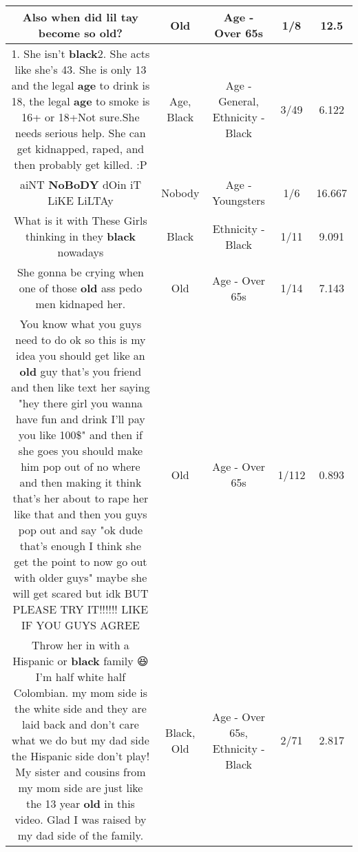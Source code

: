 \documentclass[11pt]{article}
\newlength\mylength
\begin{document}
\begin{center}
\begin{longtable}{|C{.65\mylength}|C{.30\mylength}|C{.12\mylength}|C{.12\mylength}|C{.12\mylength}|}
  \small Also when did lil tay become so \textbf{old}?\normalsize   & Old & Age - Over 65s & 1/8 & 12.5 \\  \hline
  \small 1. She isn't \textbf{black}2. She acts like she's 43. She is only 13 and the legal \textbf{age} to drink is 18, the legal \textbf{age} to smoke is 16+ or 18+Not sure.She needs serious help. She can get kidnapped, raped, and then probably get killed. :P\normalsize   & Age, Black & Age - General, Ethnicity - Black & 3/49 & 6.122 \\  \hline
  \small aiNT \textbf{NoBoDY} dOin iT LiKE LiLTAy\normalsize   & Nobody & Age - Youngsters & 1/6 & 16.667 \\  \hline
  \small What is it with These  Girls thinking in they \textbf{black} nowadays\normalsize   & Black & Ethnicity - Black & 1/11 & 9.091 \\  \hline
  \small She gonna be crying when one of those \textbf{old} ass pedo men kidnaped her.\normalsize   & Old & Age - Over 65s & 1/14 & 7.143 \\  \hline
  \small You know what you guys need to do ok so this is my idea you should get like an \textbf{old} guy that's you friend and then like text her saying "hey there girl you wanna have fun and drink I'll pay you like 100\$" and then if she goes you should make him pop out of no where and then making it think that's her about to rape her like that and then you guys pop out and say "ok dude that's enough I think she get the point to now go out with older guys" maybe she will get scared but idk BUT PLEASE TRY IT!!!!!! LIKE IF YOU GUYS AGREE\normalsize   & Old & Age - Over 65s & 1/112 & 0.893 \\  \hline
  \small Throw her in with a Hispanic or \textbf{black} family 😆 I'm half white half Colombian.  my mom side is the white side and they are laid back and don't care what we do but my dad side the Hispanic side don't play! My sister and cousins from my mom side are just like the 13 year \textbf{old} in this video. Glad I was raised by my dad side of the family.\normalsize   & Black, Old & Age - Over 65s, Ethnicity - Black & 2/71 & 2.817 \\  \hline

\end{longtable}
\end{center}
\end{document}
